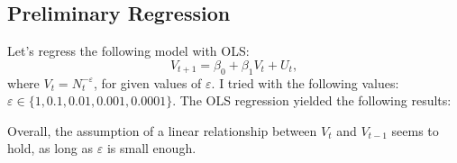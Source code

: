 \subsection{Preliminary Regression}
    Let's regress the following model with OLS:
    \begin{equation}
        V_{t+1} = \beta_0 + \beta_1 V_t + U_t,
    \end{equation}
    where $V_t=N_t^{-\varepsilon}$, for given values of $\varepsilon$.
    I tried with the following values: $\varepsilon \in \{1, 0.1, 0.01, 0.001, 0.0001\}$.
    The OLS regression yielded the following results:

    

    Overall, the assumption of a linear relationship between $V_t$ and $V_{t-1}$ seems to hold, as long as $\varepsilon$ is small enough.


